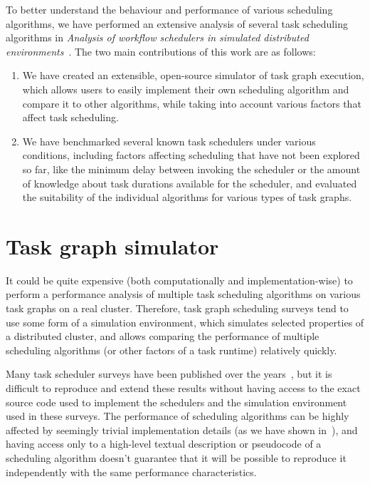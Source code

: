 To better understand the behaviour and performance of various scheduling algorithms, we have
performed an extensive analysis of several task scheduling algorithms in
\emph{Analysis of workflow schedulers in simulated distributed environments}~\cite{estee}. The two main contributions of this work are as
follows:
\begin{enumerate}
	\item We have created an extensible, open-source simulator of task graph execution, which allows users to
	      easily implement their own scheduling algorithm and compare it to other algorithms, while taking
	      into account various factors that affect task scheduling.
	\item We have benchmarked several known task schedulers under various conditions, including factors
	      affecting scheduling that have not been explored so far, like the minimum delay between invoking
	      the scheduler or the amount of knowledge about task durations available for the scheduler, and
	      evaluated the suitability of the individual algorithms for various types of task graphs.
\end{enumerate}


\section{Task graph simulator}
\label{sec:estee-simulator}
It could be quite expensive (both computationally and implementation-wise) to perform a performance
analysis of multiple task scheduling algorithms on various task graphs on a real cluster.
Therefore, task graph scheduling surveys tend to use some form of a simulation environment, which
simulates selected properties of a distributed cluster, and allows comparing the performance of
multiple scheduling algorithms (or other factors of a task runtime) relatively quickly.

Many task scheduler surveys have been published over the years~\cite{hlfet1974, kwok1998benchmarking, hagras2003static, sinnen2005, wang2018list}, but it is
difficult to reproduce and extend these results without having access to the exact source code used
to implement the schedulers and the simulation environment used in these surveys. The performance
of scheduling algorithms can be highly affected by seemingly trivial implementation details (as we
have shown in~\cite{estee}), and having access only to a high-level textual description or
pseudocode of a scheduling algorithm doesn't guarantee that it will be possible to reproduce it
independently with the same performance characteristics.

